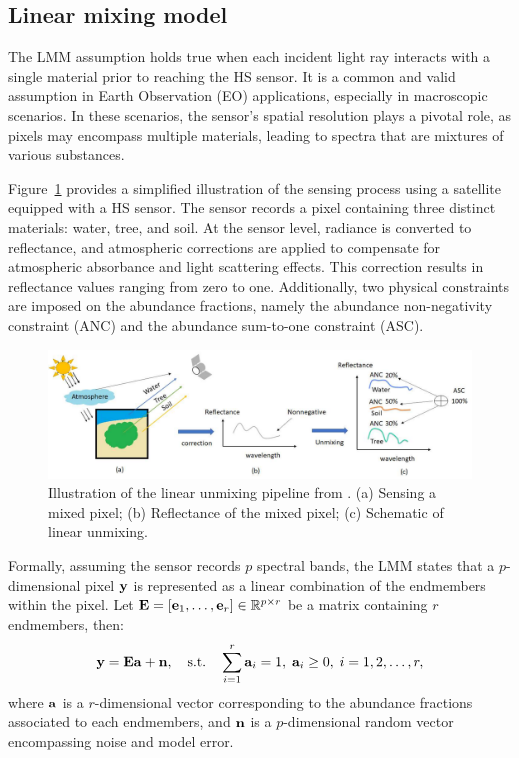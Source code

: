 \subsection{Linear mixing model}


The LMM assumption holds true when each incident light ray interacts with a single material prior to reaching the HS sensor.
It is a common and valid assumption in Earth Observation (EO) applications, especially in macroscopic scenarios.
In these scenarios, the sensor's spatial resolution plays a pivotal role, as pixels may encompass multiple materials, leading to spectra that are mixtures of various substances.

Figure~\ref{fig:LU} provides a simplified illustration of the sensing process using a satellite equipped with a HS sensor.
The sensor records a pixel containing three distinct materials: water, tree, and soil.
At the sensor level, radiance is converted to reflectance, and atmospheric corrections are applied to compensate for atmospheric absorbance and light scattering effects.
This correction results in reflectance values ranging from zero to one.
Additionally, two physical constraints are imposed on the abundance fractions, namely the abundance non-negativity constraint (ANC) and the abundance sum-to-one constraint (ASC).

\begin{figure}[h]
	\centering
	\includegraphics[width=\textwidth]{LUabs3.pdf}
	\caption{Illustration of the linear unmixing pipeline from \cite{rasti_image_2023}.
 (a) Sensing a mixed pixel; (b) Reflectance of the mixed pixel; (c) Schematic of linear unmixing.
        }
	\label{fig:LU}
\end{figure}

Formally, assuming the sensor records $p$ spectral bands, the LMM states that a $p$-dimensional pixel $\mathbf y$ is represented as a linear combination of the endmembers within the pixel.
Let $\mathbf E = \left[\mathbf e_1, \ldots, \mathbf e_r \right] \in \mathbb R^{p \times r}$ be a matrix containing $r$ endmembers, then:
\begin{equation}
    \label{eq:lmm}
    \mathbf y = \mathbf E \mathbf a + \mathbf n, \quad \text{s.t.} \quad \sum_{i=1}^r \mathbf a_i = 1, \; \mathbf a_i \geq 0, \; i = 1, 2, \ldots, r,
\end{equation}
where $\mathbf a$ is a $r$-dimensional vector corresponding to the abundance fractions associated to each endmembers, and $\mathbf n$ is a $p$-dimensional random vector encompassing noise and model error.

